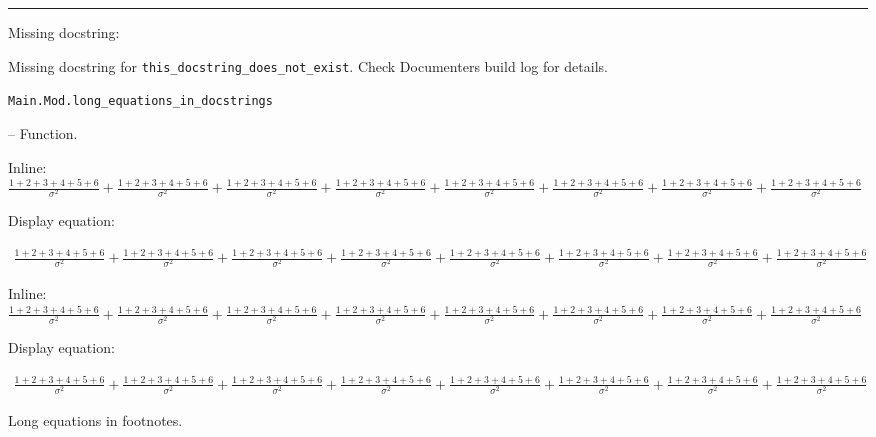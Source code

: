 {\rule{\textwidth}{1pt}}


Missing docstring:



\begin{tcolorbox}[toptitle=-1mm,bottomtitle=1mm,colback=admonition-warning!50!white,colframe=admonition-warning,title=\textbf{Missing docstring.}]
Missing docstring for \texttt{this\_docstring\_does\_not\_exist}. Check Documenter{\textquotesingle}s build log for details.

\end{tcolorbox}

\hypertarget{10369288016034589873}{\texttt{Main.Mod.long\_equations\_in\_docstrings}}  -- {Function.}

\begin{adjustwidth}{2em}{0pt}

Inline: \(\frac{1+2+3+4+5+6}{\sigma^2} + \frac{1+2+3+4+5+6}{\sigma^2} + \frac{1+2+3+4+5+6}{\sigma^2} + \frac{1+2+3+4+5+6}{\sigma^2} + \frac{1+2+3+4+5+6}{\sigma^2} + \frac{1+2+3+4+5+6}{\sigma^2} + \frac{1+2+3+4+5+6}{\sigma^2} + \frac{1+2+3+4+5+6}{\sigma^2}\)

Display equation:

\begin{equation*}
\begin{split}\frac{1+2+3+4+5+6}{\sigma^2} + \frac{1+2+3+4+5+6}{\sigma^2} + \frac{1+2+3+4+5+6}{\sigma^2} + \frac{1+2+3+4+5+6}{\sigma^2} + \frac{1+2+3+4+5+6}{\sigma^2} + \frac{1+2+3+4+5+6}{\sigma^2} + \frac{1+2+3+4+5+6}{\sigma^2} + \frac{1+2+3+4+5+6}{\sigma^2}\end{split}\end{equation*}
\begin{tcolorbox}[toptitle=-1mm,bottomtitle=1mm,colback=admonition-note!50!white,colframe=admonition-note,title=\textbf{Long equations in admonitions}]
Inline: \(\frac{1+2+3+4+5+6}{\sigma^2} + \frac{1+2+3+4+5+6}{\sigma^2} + \frac{1+2+3+4+5+6}{\sigma^2} + \frac{1+2+3+4+5+6}{\sigma^2} + \frac{1+2+3+4+5+6}{\sigma^2} + \frac{1+2+3+4+5+6}{\sigma^2} + \frac{1+2+3+4+5+6}{\sigma^2} + \frac{1+2+3+4+5+6}{\sigma^2}\)

Display equation:

\begin{equation*}
\begin{split}\frac{1+2+3+4+5+6}{\sigma^2} + \frac{1+2+3+4+5+6}{\sigma^2} + \frac{1+2+3+4+5+6}{\sigma^2} + \frac{1+2+3+4+5+6}{\sigma^2} + \frac{1+2+3+4+5+6}{\sigma^2} + \frac{1+2+3+4+5+6}{\sigma^2} + \frac{1+2+3+4+5+6}{\sigma^2} + \frac{1+2+3+4+5+6}{\sigma^2}\end{split}\end{equation*}
\end{tcolorbox}
Long equations in footnotes.\footnotemark[1]


\end{adjustwidth}
